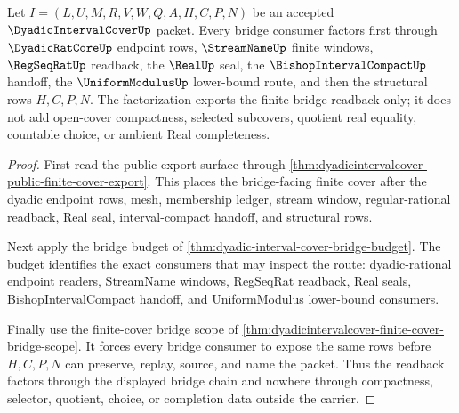 \begin{theorem}
\label{thm:dyadicintervalcover-bridge-readback-factorization}
Let $I=(L,U,M,R,V,W,Q,A,H,C,P,N)$ be an accepted $\DyadicIntervalCoverUp$ packet. Every bridge consumer factors first through $\DyadicRatCoreUp$ endpoint rows, $\StreamNameUp$ finite windows, $\RegSeqRatUp$ readback, the $\RealUp$ seal, the $\BishopIntervalCompactUp$ handoff, the $\UniformModulusUp$ lower-bound route, and then the structural rows $H,C,P,N$. The factorization exports the finite bridge readback only; it does not add open-cover compactness, selected subcovers, quotient real equality, countable choice, or ambient Real completeness.
\end{theorem}
\begin{proof}
First read the public export surface through \autoref{thm:dyadicintervalcover-public-finite-cover-export}. This places the bridge-facing finite cover after the dyadic endpoint rows, mesh, membership ledger, stream window, regular-rational readback, Real seal, interval-compact handoff, and structural rows.

Next apply the bridge budget of \autoref{thm:dyadic-interval-cover-bridge-budget}. The budget identifies the exact consumers that may inspect the route: dyadic-rational endpoint readers, StreamName windows, RegSeqRat readback, Real seals, BishopIntervalCompact handoff, and UniformModulus lower-bound consumers.

Finally use the finite-cover bridge scope of \autoref{thm:dyadicintervalcover-finite-cover-bridge-scope}. It forces every bridge consumer to expose the same rows before $H,C,P,N$ can preserve, replay, source, and name the packet. Thus the readback factors through the displayed bridge chain and nowhere through compactness, selector, quotient, choice, or completion data outside the carrier.
\end{proof}
